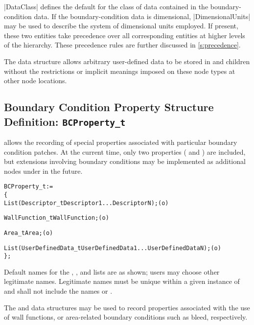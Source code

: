 |DataClass| defines the default for the class of data contained in the
boundary-condition data.
If the boundary-condition data is dimensional, |DimensionalUnits| may be
used to describe the system of dimensional units employed.
If present, these two entities take precedence over all corresponding
entities at higher levels of the hierarchy.
These precedence rules are further discussed in \autoref{s:precedence}.

The  data structure allows arbitrary
user-defined data to be stored in  and
 children without the restrictions or implicit
meanings imposed on these node types at other node locations.

\subsection{Boundary Condition Property Structure Definition: \texttt{BCProperty\_t}}
\label{s:BCProperty}

 allows the recording of special properties associated
with particular boundary condition patches.
At the current time, only two properties (
and ) are included, but extensions involving
boundary conditions may be implemented as additional nodes under
 in the future.

\begin{alltt}
  BCProperty\_t :=
    \{
    List( Descriptor\_t  Descriptor1 ... DescriptorN ) ;                     (o)

    WallFunction\_t WallFunction ;                                           (o)

    Area\_t Area ;                                                           (o)

    List( UserDefinedData\_t UserDefinedData1 ... UserDefinedDataN ) ;       (o)
    \} ;
\end{alltt}

\begin{notes}
\item
 Default names for the , , and
 lists are as shown; users may choose other legitimate names.
 Legitimate names must be unique within a given instance of
  and shall not include the names  or
 .
\end{notes}

The  and  data structures may be
used to record properties associated with the use of wall functions, or
area-related boundary conditions such as bleed, respectively.

